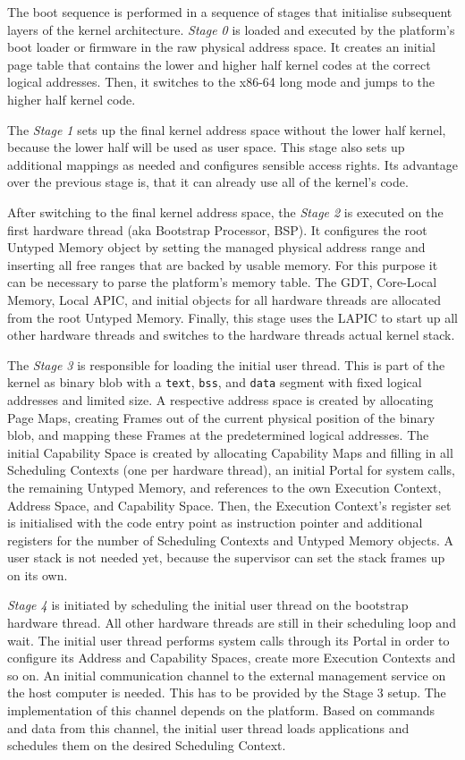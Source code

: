 The boot sequence is performed in a sequence of stages that initialise subsequent layers of the kernel architecture.
%
\emph{Stage 0} is loaded and executed by the platform's boot loader or firmware in the raw physical address space. It creates an initial page table that contains the lower and higher half kernel codes at the correct logical addresses. Then, it switches to the x86-64 long mode and jumps to the higher half kernel code. 

The \emph{Stage 1} sets up the final kernel address space without the lower half kernel, because the lower half will be used as user space. This stage also sets up additional mappings as needed and configures sensible access rights. Its advantage over the previous stage is, that it can already use all of the kernel's code.

After switching to the final kernel address space, the \emph{Stage 2} is executed on the first hardware thread (aka Bootstrap Processor, BSP). It configures the root Untyped Memory object by setting the managed physical address range and inserting all free ranges that are backed by usable memory. For this purpose it can be necessary to parse the platform's memory table. The GDT, Core-Local Memory, Local APIC, and initial objects for all hardware threads are allocated from the root Untyped Memory. Finally, this stage uses the LAPIC to start up all other hardware threads and switches to the hardware threads actual kernel stack.

The \emph{Stage 3} is responsible for loading the initial user thread. This is part of the kernel as binary blob with a \texttt{text}, \texttt{bss}, and \texttt{data} segment with fixed logical addresses and limited size. A respective address space is created by allocating Page Maps, creating Frames out of the current physical position of the binary blob, and mapping these Frames at the predetermined logical addresses. The initial Capability Space is created by allocating Capability Maps and filling in all Scheduling Contexts (one per hardware thread), an initial Portal for system calls, the remaining Untyped Memory, and references to the own Execution Context, Address Space, and Capability Space. Then, the Execution Context's register set is initialised with the code entry point as instruction pointer and additional registers for the number of Scheduling Contexts and Untyped Memory objects. A user stack is not needed yet, because the supervisor can set the stack frames up on its own.     

\emph{Stage 4} is initiated by scheduling the initial user thread on the bootstrap hardware thread. All other hardware threads are still in their scheduling loop and wait. The initial user thread performs system calls through its Portal in order to configure its Address and Capability Spaces, create more Execution Contexts and so on. An initial communication channel to the external management service on the host computer is needed. This has to be provided by the Stage 3 setup. The implementation of this channel depends on the platform. Based on commands and data from this channel, the initial user thread loads applications and schedules them on the desired Scheduling Context.


